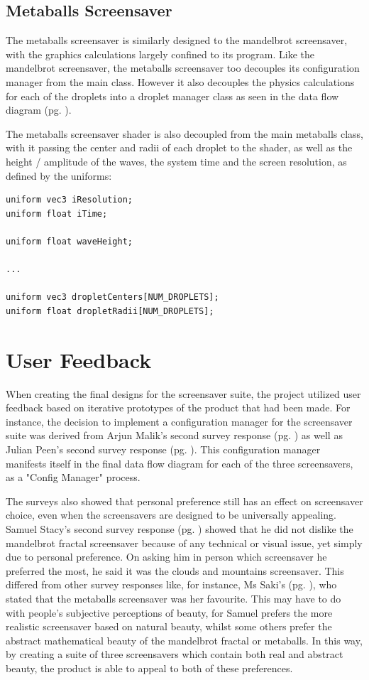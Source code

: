 \documentclass[10pt, openany]{book}
\begin{document}
\subsection{Metaballs Screensaver}
The metaballs screensaver is similarly designed to the mandelbrot screensaver, with the graphics calculations largely confined to its  program. Like the mandelbrot screensaver, the metaballs screensaver too decouples its configuration manager from the main class. However it also decouples the physics calculations for each of the droplets into a droplet manager class as seen in the data flow diagram (pg. \pageref{app:metaballs-dfd}).

The metaballs screensaver shader is also decoupled from the main metaballs class, with it passing the center and radii of each droplet to the shader, as well as the height / amplitude of the waves, the system time and the screen resolution, as defined by the uniforms:

\begin{verbatim}
uniform vec3 iResolution;
uniform float iTime;

uniform float waveHeight;

...

uniform vec3 dropletCenters[NUM_DROPLETS];
uniform float dropletRadii[NUM_DROPLETS];
\end{verbatim}

\section{User Feedback}
When creating the final designs for the screensaver suite, the project utilized user feedback based on iterative prototypes of the product that had been made. For instance, the decision to implement a configuration manager for the screensaver suite was derived from Arjun Malik's second survey response (pg. \pageref{app:survey-arjun-2}) as well as Julian Peen's second survey response (pg. \pageref{app:survey-julian-2}). This configuration manager manifests itself in the final data flow diagram for each of the three screensavers, as a "Config Manager" process.

The surveys also showed that personal preference still has an effect on screensaver choice, even when the screensavers are designed to be universally appealing. Samuel Stacy's second survey response (pg. \pageref{app:survey-sam-2}) showed that he did not dislike the mandelbrot fractal screensaver because of any technical or visual issue, yet simply due to personal preference. On asking him in person which screensaver he preferred the most, he said it was the clouds and mountains screensaver. This differed from other survey responses like, for instance, Ms Saki's (pg. \pageref{app:survey-aartee}), who stated that the metaballs screensaver was her favourite. This may have to do with people's subjective perceptions of beauty, for Samuel prefers the more realistic screensaver based on natural beauty, whilst some others prefer the abstract mathematical beauty of the mandelbrot fractal or metaballs. In this way, by creating a suite of three screensavers which contain both real and abstract beauty, the product is able to appeal to both of these preferences.
\end{document}
